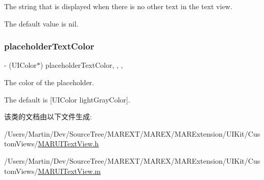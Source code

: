 The string that is displayed when there is no other text in the text view.

The default value is {\ttfamily nil}. \mbox{\label{interface_m_a_r_u_i_text_view_a53edbf7ad4e03c3f9de44712c8c2ccf8}} 
\subsubsection{\texorpdfstring{placeholder\+Text\+Color}{placeholderTextColor}}
{\footnotesize\ttfamily -\/ (U\+I\+Color$\ast$) placeholder\+Text\+Color\hspace{0.3cm}{\ttfamily [read]}, {\ttfamily [write]}, {\ttfamily [nonatomic]}, {\ttfamily [strong]}}

The color of the placeholder.

The default is {\ttfamily \mbox{[}U\+I\+Color light\+Gray\+Color\mbox{]}}. 

该类的文档由以下文件生成\+:\begin{DoxyCompactItemize}
\item 
/\+Users/\+Martin/\+Dev/\+Source\+Tree/\+M\+A\+R\+E\+X\+T/\+M\+A\+R\+E\+X/\+M\+A\+R\+Extension/\+U\+I\+Kit/\+Custom\+Views/\hyperlink{_m_a_r_u_i_text_view_8h}{M\+A\+R\+U\+I\+Text\+View.\+h}\item 
/\+Users/\+Martin/\+Dev/\+Source\+Tree/\+M\+A\+R\+E\+X\+T/\+M\+A\+R\+E\+X/\+M\+A\+R\+Extension/\+U\+I\+Kit/\+Custom\+Views/\hyperlink{_m_a_r_u_i_text_view_8m}{M\+A\+R\+U\+I\+Text\+View.\+m}\end{DoxyCompactItemize}
